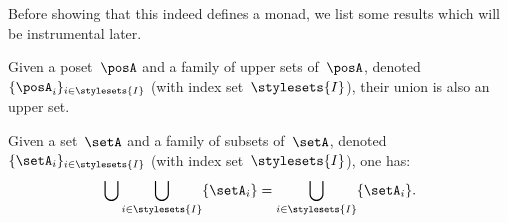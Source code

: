 Before showing that this indeed defines a monad, we list some results which will be instrumental later.
\begin{lemma}
    \label{lem:upperunionupper}
    Given a poset~$\posA$ and a family of upper sets of~$\posA$, denoted~$\{\posA_i\}_{i\in \stylesets{I}}$ (with index set~$\stylesets{I}$), their union is also an upper set.
\end{lemma}

\begin{lemma}
    \label{lem:setunionset}
    Given a set~$\setA$ and a family of subsets of~$\setA$, denoted~$\{\setA_i\}_{i\in \stylesets{I}}$ (with index set~$\stylesets{I}$), one has:
    \begin{equation}
        \bigcup \bigcup_{i\in \stylesets{I}}\{\setA_i\} = \bigcup_{i\in \stylesets{I}}\{\setA_i\}.
    \end{equation}
\end{lemma}

